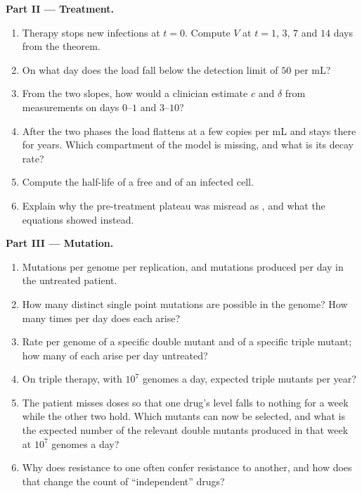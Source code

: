 \begin{problem}
\medskip
\noindent\textbf{Part II --- Treatment.}
\begin{enumerate}[resume]
  \item Therapy stops new infections at $t = 0$. Compute $V$ at $t =
        1$, $3$, $7$ and $14$ days from the theorem.
  \item On what day does the load fall below the detection limit of
        $50$ per mL?
  \item From the two slopes, how would a clinician estimate $c$ and
        $\delta$ from measurements on days $0$--$1$ and $3$--$10$?
  \item After the two phases the load flattens at a few copies per mL
        and stays there for years. Which compartment of the model is
        missing, and what is its decay rate?
  \item Compute the half-life of a free  and of an infected cell.
  \item Explain why the pre-treatment plateau was misread as ,
        and what the equations showed instead.
\end{enumerate}

\medskip
\noindent\textbf{Part III --- Mutation.}
\begin{enumerate}[resume]
  \item Mutations per genome per replication, and mutations produced
        per day in the untreated patient.
  \item How many distinct single point mutations are possible in the
        genome? How many times per day does each arise?
  \item Rate per genome of a specific double mutant and of a specific
        triple mutant; how many of each arise per day untreated?
  \item On triple therapy, with $10^{7}$ genomes a day, expected
        triple mutants per year?
  \item The patient misses doses so that one drug's level falls to
        nothing for a week while the other two hold. Which mutants can
        now be selected, and what is the expected number of the
        relevant double mutants produced in that week at $10^{7}$
        genomes a day?
  \item Why does resistance to one  often confer
        resistance to another, and how does that change the count of
        ``independent'' drugs?
\end{enumerate}


\end{problem}
